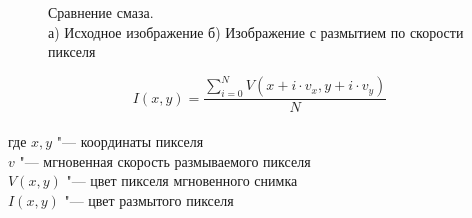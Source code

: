 \begin{figure}
    \centering
    \begin{minipage}[h]{0.49\linewidth}
    \end{minipage}
    \hfill
    \begin{minipage}[h]{0.49\linewidth}
    \end{minipage}
    \caption{Сравнение смаза. \\ а) Исходное изображение б) Изображение с размытием по скорости пикселя}
    \label{fig:pixel_blur}
\end{figure} 

\begin{eqndesc}
    \begin{equation}\label{F:F2_2_1}
        I(x,y) = \frac{\sum_{i=0}^{N} {V(x + i \cdot v_x, y + i \cdot v_y)}}{N}
    \end{equation}
    \\
    где $x,y$ "--- координаты пикселя \\
    $v$ "--- мгновенная скорость размываемого пикселя  \\
    $V(x,y)$ "--- цвет пикселя мгновенного снимка \\
    $I(x,y)$ "--- цвет размытого пикселя
\end{eqndesc}



